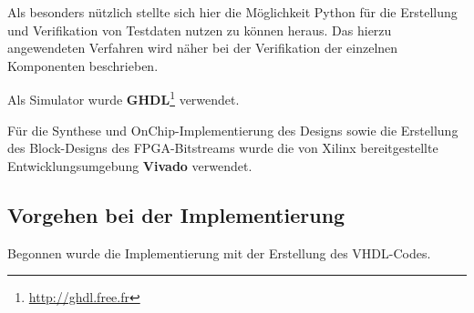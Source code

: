 Als besonders nützlich stellte sich hier die Möglichkeit Python für die Erstellung und Verifikation von Testdaten nutzen zu können heraus.
Das hierzu angewendeten Verfahren wird näher bei der Verifikation der einzelnen Komponenten beschrieben. 

Als Simulator wurde \textbf{GHDL}\footnote{\href{http://ghdl.free.fr}{http://ghdl.free.fr}} verwendet.

Für die Synthese und OnChip-Implementierung des Designs sowie die Erstellung des Block-Designs des \acs{FPGA}-Bitstreams wurde die von Xilinx bereitgestellte Entwicklungsumgebung \textbf{Vivado} verwendet.

\subsection{Vorgehen bei der Implementierung}

Begonnen wurde die Implementierung mit der Erstellung des \acs{VHDL}-Codes.

